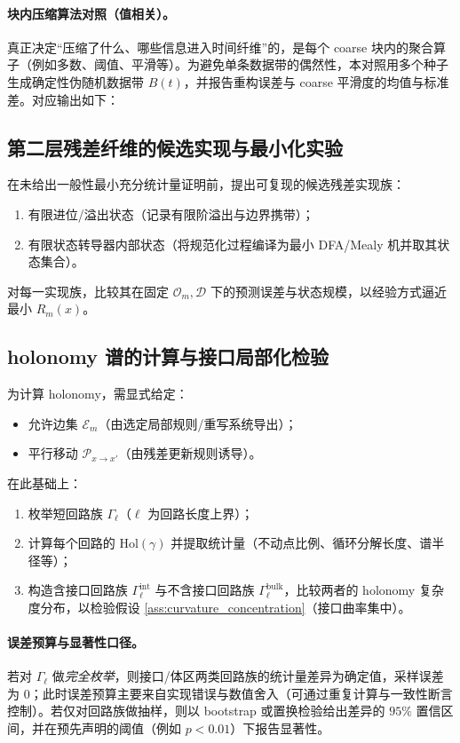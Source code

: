 \paragraph{块内压缩算法对照（值相关）。}
\AuditTag 真正决定“压缩了什么、哪些信息进入时间纤维”的，是每个 coarse 块内的聚合算子（例如多数、阈值、平滑等）。为避免单条数据带的偶然性，本对照用多个种子生成确定性伪随机数据带 $B(t)$，并报告重构误差与 coarse 平滑度的均值与标准差。对应输出如下：


\subsection{第二层残差纤维的候选实现与最小化实验}

在未给出一般性最小充分统计量证明前，提出可复现的候选残差实现族：
\begin{enumerate}
  \item 有限进位/溢出状态（记录有限阶溢出与边界携带）；
  \item 有限状态转导器内部状态（将规范化过程编译为最小 DFA/Mealy 机并取其状态集合）。
\end{enumerate}
对每一实现族，比较其在固定 $\mathcal O_m,\mathcal D$ 下的预测误差与状态规模，以经验方式逼近最小 $R_m(x)$。

\subsection{holonomy 谱的计算与接口局部化检验}

为计算 holonomy，需显式给定：
\begin{itemize}
  \item 允许边集 $\mathcal E_m$（由选定局部规则/重写系统导出）；
  \item 平行移动 $\mathcal P_{x\to x'}$（由残差更新规则诱导）。
\end{itemize}
在此基础上：
\begin{enumerate}
  \item 枚举短回路族 $\Gamma_\ell$（$\ell$ 为回路长度上界）；
  \item 计算每个回路的 $\mathrm{Hol}(\gamma)$ 并提取统计量（不动点比例、循环分解长度、谱半径等）；
  \item 构造含接口回路族 $\Gamma_\ell^{\mathrm{int}}$ 与不含接口回路族 $\Gamma_\ell^{\mathrm{bulk}}$，比较两者的 holonomy 复杂度分布，以检验假设 \ref{ass:curvature_concentration}（接口曲率集中）。
\end{enumerate}
\paragraph{误差预算与显著性口径。}
\AuditTag 若对 $\Gamma_\ell$ 做\emph{完全枚举}，则接口/体区两类回路族的统计量差异为确定值，采样误差为 $0$；此时误差预算主要来自实现错误与数值舍入（可通过重复计算与一致性断言控制）。若仅对回路族做抽样，则以 bootstrap 或置换检验给出差异的 $95\%$ 置信区间，并在预先声明的阈值（例如 $p<0.01$）下报告显著性。

